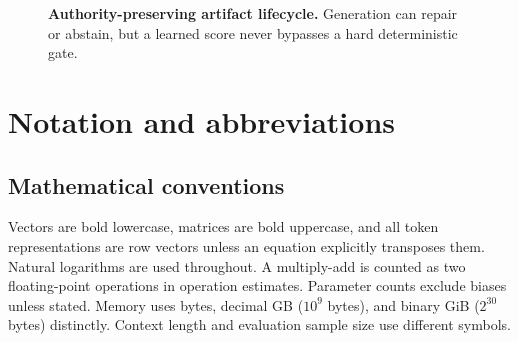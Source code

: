 \documentclass[10pt,letterpaper]{article}
\newcommand{\1}{\mathbb{1}}
\begin{document}
\begin{figure}[t]
  \centering
  \resizebox{\linewidth}{!}{}
  \caption{\textbf{Authority-preserving artifact lifecycle.} Generation can repair or abstain, but a
  learned score never bypasses a hard deterministic gate.}
  \label{fig:lifecycle}
\end{figure}

\section{Notation and abbreviations}

\subsection{Mathematical conventions}

Vectors are bold lowercase, matrices are bold uppercase, and all token representations are row
vectors unless an equation explicitly transposes them.  Natural logarithms are used throughout.
A multiply-add is counted as two floating-point operations in operation estimates.  Parameter counts
exclude biases unless stated.  Memory uses bytes, decimal GB ($10^9$ bytes), and binary GiB
($2^{30}$ bytes) distinctly.  Context length and evaluation sample size use different symbols.
\end{document}
